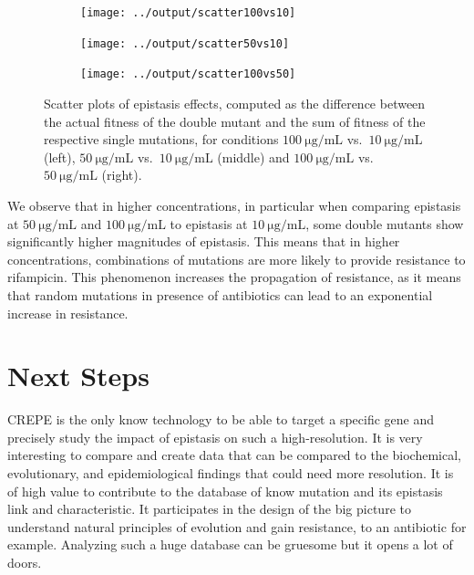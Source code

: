 \documentclass[12pt]{article}
\begin{document}
  \begin{figure}[!ht]
    \begin{subfigure}{.33\textwidth}
      \centering
      \texttt{[image: ../output/scatter100vs10]}
    \end{subfigure}
    \begin{subfigure}{.33\textwidth}
      \centering
      \texttt{[image: ../output/scatter50vs10]}
    \end{subfigure}
    \begin{subfigure}{.33\textwidth}
      \centering
      \texttt{[image: ../output/scatter100vs50]}
    \end{subfigure}
    \caption{Scatter plots of epistasis effects, computed as the difference
    between the actual fitness of the double mutant and the sum of fitness of
    the respective single mutations, for conditions
    $\SI{100}{\micro\gram\per\milli\liter}$ vs.\
    $\SI{10}{\micro\gram\per\milli\liter}$ (left),
    $\SI{50}{\micro\gram\per\milli\liter}$ vs.\
    $\SI{10}{\micro\gram\per\milli\liter}$ (middle) and
    $\SI{100}{\micro\gram\per\milli\liter}$ vs.\
    $\SI{50}{\micro\gram\per\milli\liter}$ (right).}%
    \label{fig:epicompare}
  \end{figure}

  We observe that in higher concentrations, in particular when comparing
  epistasis at $\SI{50}{\micro\gram\per\milli\liter}$ and
  $\SI{100}{\micro\gram\per\milli\liter}$ to epistasis at 
  $\SI{10}{\micro\gram\per\milli\liter}$, some double mutants show
  significantly higher magnitudes of epistasis. This means that in higher
  concentrations, combinations of mutations are more likely to provide
  resistance to rifampicin. This phenomenon increases the propagation of
  resistance, as it means that random mutations in presence of antibiotics can
  lead to an exponential increase in resistance.

  \section{Next Steps}

  CREPE is the only know technology to be able to target a specific gene and
  precisely study the impact of epistasis on such a high-resolution. It is very
  interesting to compare and create data that can be compared to the biochemical,
  evolutionary, and epidemiological findings that could need more resolution. It
  is of high value to contribute to the database of know mutation and its
  epistasis link and characteristic. It participates in the design of the big
  picture to understand natural principles of evolution and gain resistance, to
  an antibiotic for example. Analyzing such a huge database can be gruesome but
  it opens a lot of doors.
\end{document}
